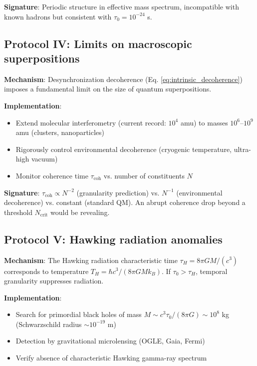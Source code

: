 \documentclass[11pt,a4paper]{article}
\begin{document}
\textbf{Signature}: Periodic structure in effective mass spectrum, incompatible with known hadrons but consistent with $\tau_0 = 10^{-24}$ s.

\subsection{Protocol IV: Limits on macroscopic superpositions}

\textbf{Mechanism}: Desynchronization decoherence (Eq. \ref{eq:intrinsic_decoherence}) imposes a fundamental limit on the size of quantum superpositions.

\textbf{Implementation}:
\begin{itemize}[leftmargin=*]
    \item Extend molecular interferometry (current record: $10^4$ amu) to masses $10^6$--$10^9$ amu (clusters, nanoparticles)
    \item Rigorously control environmental decoherence (cryogenic temperature, ultra-high vacuum)
    \item Monitor coherence time $\tau_{\text{coh}}$ vs. number of constituents $N$
\end{itemize}

\textbf{Signature}: $\tau_{\text{coh}} \propto N^{-2}$ (granularity prediction) vs. $N^{-1}$ (environmental decoherence) vs. constant (standard QM). An abrupt coherence drop beyond a threshold $N_{\text{crit}}$ would be revealing.

\subsection{Protocol V: Hawking radiation anomalies}

\textbf{Mechanism}: The Hawking radiation characteristic time $\tau_H = 8\pi GM/(c^3)$ corresponds to temperature $T_H = \hbar c^3/(8\pi GMk_B)$. If $\tau_0 > \tau_H$, temporal granularity suppresses radiation.

\textbf{Implementation}:
\begin{itemize}[leftmargin=*]
    \item Search for primordial black holes of mass $M \sim c^3\tau_0/(8\pi G) \sim 10^8$ kg (Schwarzschild radius $\sim 10^{-19}$ m)
    \item Detection by gravitational microlensing (OGLE, Gaia, Fermi)
    \item Verify absence of characteristic Hawking gamma-ray spectrum
\end{itemize}
\end{document}

